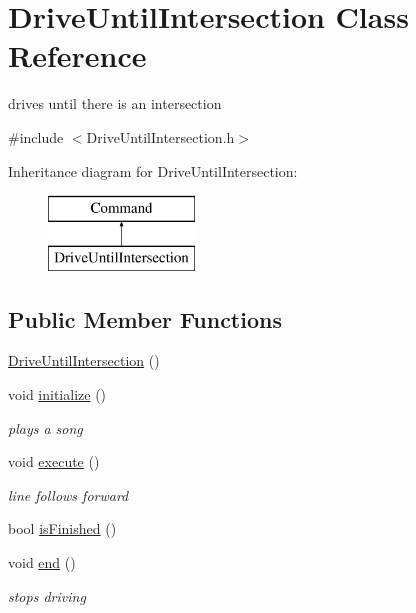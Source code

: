 \hypertarget{classDriveUntilIntersection}{\section{Drive\-Until\-Intersection Class Reference}
\label{classDriveUntilIntersection}
}


drives until there is an intersection  




{\ttfamily \#include $<$Drive\-Until\-Intersection.\-h$>$}

Inheritance diagram for Drive\-Until\-Intersection\-:\begin{figure}[H]
\begin{center}
\leavevmode
\includegraphics[height=2.000000cm]{classDriveUntilIntersection}
\end{center}
\end{figure}
\subsection*{Public Member Functions}
\begin{DoxyCompactItemize}
\item 
\hyperlink{classDriveUntilIntersection_a7cfe773856d717eb645c3788e414186d}{Drive\-Until\-Intersection} ()
\item 
void \hyperlink{classDriveUntilIntersection_a7f42c796bcea682dea57f1439cc59f7b}{initialize} ()
\begin{DoxyCompactList}\small\item\em plays a song \end{DoxyCompactList}\item 
void \hyperlink{classDriveUntilIntersection_ae670d4da34843889558d42c94fc1e292}{execute} ()
\begin{DoxyCompactList}\small\item\em line follows forward \end{DoxyCompactList}\item 
bool \hyperlink{classDriveUntilIntersection_a345809c722142166801f6ecbca117758}{is\-Finished} ()
\item 
void \hyperlink{classDriveUntilIntersection_a309d1f37d92844707c2f3dcb2f5d5638}{end} ()
\begin{DoxyCompactList}\small\item\em stops driving \end{DoxyCompactList}\end{DoxyCompactItemize}
